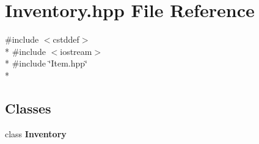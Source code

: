 \section{Inventory.\-hpp File Reference}
\label{_inventory_8hpp}
{\ttfamily \#include $<$cstddef$>$}\\*
{\ttfamily \#include $<$iostream$>$}\\*
{\ttfamily \#include \char`\"{}Item.\-hpp\char`\"{}}\\*
\subsection*{Classes}
\begin{DoxyCompactItemize}
\item 
class {\bf Inventory}
\end{DoxyCompactItemize}
